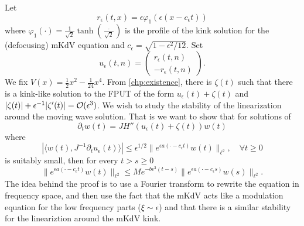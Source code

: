Let 
\begin{equation}
	r_\epsilon(t,x) = \epsilon \varphi_1(\epsilon (x - c_\epsilon t))
\end{equation}
where \(\varphi_1(\cdot)=  \frac 1 {\sqrt 2 }\tanh(\frac \cdot {\sqrt 2})\) is the profile of the kink solution for the (defocusing) mKdV equation and \(c_\epsilon = \sqrt{1 - \epsilon^2/12}\). Set 
\begin{equation}
	u_{\epsilon} (t,n) = \begin{pmatrix}
		r_\epsilon(t,n) \\
		-r_\epsilon(t,n)
	\end{pmatrix}.
\end{equation}
We fix \(V(x) = \frac 1 2 x^2 - \frac 1 {24} x^4\). From \cref{chp:existence}, there is \(\zeta(t)\) such that there is a kink-like solution to the FPUT of the form \(u_\epsilon(t) + \zeta(t)\) and \(|\zeta(t)| + \epsilon^{-1} |\zeta'(t)| = \mathcal{O}( \epsilon^3)\). We wish to study the stability of the linearization around the moving wave solution. That is we want to show that for solutions of
\begin{equation}\label{linearization-eqn}
	\partial_t w (t) = J H''(u_\epsilon(t) + \zeta(t))w(t)
\end{equation}
where 
\begin{equation}\label{orthogonality-condition}
	|\langle w(t), J^{-1} \partial_t u_{\epsilon} (t) \rangle| \leq \epsilon^{1/2} \| e ^{\epsilon a (\cdot - c_\epsilon t)} w(t) \|_{\ell^2}, \quad \forall t \geq 0
\end{equation}
is suitably small, then for every \(t > s \geq 0\)
\begin{equation}\label{exponential-linear-stability}
	\| e^{\epsilon a(\cdot - c_\epsilon t)} w(t) \|_{\ell^2} \leq M e^{-b\epsilon^3 (t-s)} \| e^{\epsilon a(\cdot - c_\epsilon s)} w(s) \|_{\ell^2} .
\end{equation}
The idea behind the proof is to use a Fourier transform to rewrite the equation in frequency space, and then use the fact that the mKdV acts like a modulation equation for the low frequency parts (\(\xi \sim \epsilon\)) and that there is a similar stability for the lineariztion around the mKdV kink. 


